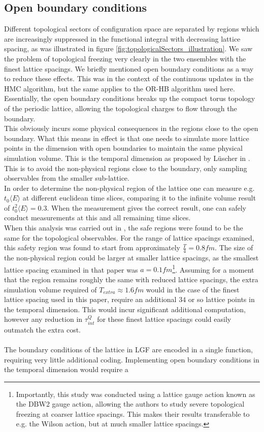 \documentclass[a4paper,10pt]{book}
\begin{document}
\subsection{Open boundary conditions}
Different topological sectors of configuration space are separated by regions which are increasingly suppressed in the functional integral with decreasing lattice spacing, as was illustrated in figure \ref{fig:topologicalSectors_illustration}. 
We saw the problem of topological freezing very clearly in the two ensembles with the finest lattice spacings. We briefly mentioned open boundary conditions as a way to reduce these effects. This was in the context of the continuous updates in the HMC algorithm, but the same applies to the OR-HB algorithm used here. Essentially, the open boundary conditions breaks up the compact torus topology of the periodic lattice, allowing the topological charges to flow through the boundary.\\This obviously incurs some physical consequences in the regions close to the open boundary. What this means in effect is that one needs to simulate more lattice points in the dimension with open boundaries to maintain the same physical simulation volume. This is the temporal dimension as proposed by Lüscher in \cite{Lusch_top_bar}. This is to avoid the non-physical regions close to the boundary, only sampling observables from the smaller sub-lattice.\\In order to determine the non-physical region of the lattice one can measure e.g. $t_0\langle E \rangle$ at different euclidean time slices, comparing it to the infinite volume result of $t_0^2\langle E \rangle = 0.3$. When the measurement gives the correct result, one can safely conduct measurements at this and all remaining time slices.\\When this analysis was carried out in \cite{PhysRevD.90.074502}, the safe regions were found to be the same for the topological observables. For the range of lattice spacings examined, this safety region was found to start from approximately $\frac{T}{4}=0.8fm$. The size of the non-physical region could be larger at smaller lattice spacings, as the smallest lattice spacing examined in that paper was $a=0.1fm$\footnote{Importantly, this study was conducted using a lattice gauge action known as the DBW2 gauge action, allowing the authors to study severe topological freezing at coarser lattice spacings. This makes their results transferable to e.g. the Wilson action, but at much smaller lattice spacings.}. Assuming for a moment that the region remains roughly the same with reduced lattice spacings, the extra simulation volume required of $T_{extra} \approx 1.6fm$ would in the case of the finest lattice spacing used in this paper, require an additional $34$ or so lattice points in the temporal dimension. This would incur significant additional computation, however any reduction in $\tau_{int}^Q$ for these finest lattice spacings could easily outmatch the extra cost.\\\\The boundary conditions of the lattice in LGF are encoded in a single function, requiring very little additional coding. Implementing open boundary conditions in the temporal dimension would require a 
\end{document}

